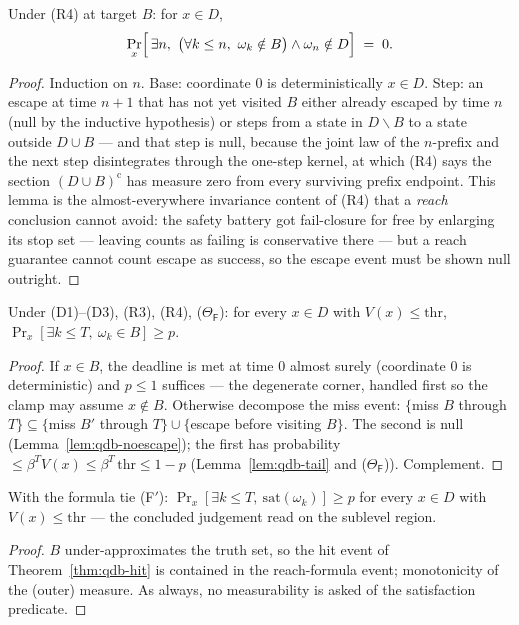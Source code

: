 \begin{blemma}[no escape]\label{lem:qdb-noescape}
Under (R4) at target $B$: for $x \in D$,
\[
\Pr_x\Bigl[\,\exists n,\ \bigl(\forall k \le n,\ \omega_k \notin B\bigr)
\wedge \omega_n \notin D \Bigr] \;=\; 0 .
\]
\end{blemma}
\begin{proof}
Induction on $n$. Base: coordinate $0$ is deterministically $x \in D$.
Step: an escape at time $n+1$ that has not yet visited $B$ either
already escaped by time $n$ (null by the inductive hypothesis) or steps
from a state in $D \smallsetminus B$ to a state outside $D \cup B$ ---
and that step is null, because the joint law of the $n$-prefix and the
next step disintegrates through the one-step kernel, at which (R4) says
the section $(D \cup B)^{\mathrm{c}}$ has measure zero from every
surviving prefix endpoint. This lemma is the almost-everywhere
invariance content of (R4) that a \emph{reach} conclusion cannot avoid:
the safety battery got fail-closure for free by enlarging its stop set
--- leaving counts as failing is conservative there --- but a reach
guarantee cannot count escape as success, so the escape event must be
shown null outright.
\end{proof}

\begin{bthm}\label{thm:qdb-hit}
Under (D1)--(D3), (R3), (R4), ($\Theta_{\mathsf F}$): for every
$x \in D$ with $V(x) \le \mathrm{thr}$,
$\Pr_x[\exists k \le T,\ \omega_k \in B] \ge p$.
\end{bthm}
\begin{proof}
If $x \in B$, the deadline is met at time $0$ almost surely (coordinate
$0$ is deterministic) and $p \le 1$ suffices --- the degenerate corner,
handled first so the clamp may assume $x \notin B$. Otherwise decompose
the miss event: $\{$miss $B$ through $T\} \subseteq \{$miss $B'$ through
$T\} \cup \{$escape before visiting $B\}$. The second is null
(Lemma~\ref{lem:qdb-noescape}); the first has probability
$\le \beta^{T} V(x) \le \beta^{T}\,\mathrm{thr} \le 1 - p$
(Lemma~\ref{lem:qdb-tail} and ($\Theta_{\mathsf F}$)). Complement.
\end{proof}

\begin{bprop}
\label{prop:qdb-sound}
With the formula tie (F$'$): $\Pr_x[\exists k \le T,\
\mathrm{sat}(\omega_k)] \ge p$ for every $x \in D$ with
$V(x) \le \mathrm{thr}$ --- the concluded judgement read on the sublevel
region.
\end{bprop}
\begin{proof}
$B$ under-approximates the truth set, so the hit event of
Theorem~\ref{thm:qdb-hit} is contained in the reach-formula event;
monotonicity of the (outer) measure. As always, no measurability is
asked of the satisfaction predicate.
\end{proof}

